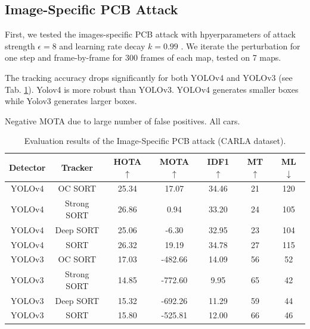 \vfill
\clearpage

\subsection{Image-Specific PCB Attack}

First, we tested the images-specific PCB attack with hpyerparameters of attack strength $\epsilon=8$ and learning rate decay $k=0.99$ . We iterate the perturbation for one step and frame-by-frame for 300 frames of each map, tested on 7 maps.


The tracking accuracy drops significantly for both YOLOv4 and YOLOv3 (see Tab. \ref{tab.carla_pcb}). Yolov4 is more robust than YOLOv3. YOLOv4 generates smaller boxes while Yolov3 generates larger boxes.

Negative MOTA due to large number of false positives. All cars.


\begin{table}[H]
\centering
\begin{tabular}{ ccccccc } 
\hline
Detector & Tracker & HOTA $\uparrow$ & MOTA $\uparrow$ & IDF1 $\uparrow$ & MT $\uparrow$ & ML $\downarrow$ \\
\hline
YOLOv4 & OC SORT      &  25.34 &  17.07  &  34.46  &  21  &  120  \\
YOLOv4 & Strong SORT  &  26.86  &  0.94  &  33.20  &  24  & 105 \\ 
YOLOv4 & Deep SORT    &  25.06 &  -6.30  &  32.95  &  23 
 &  104  \\ 
YOLOv4 & SORT         &  26.32  &  19.19  &  34.78  &  27  &  115  \\ 
\hline
YOLOv3 & OC SORT      &  17.03 &  -482.66  &  14.09  &  56  &  52  \\
YOLOv3 & Strong SORT  &  14.85  &  -772.60  &  9.95  &  65 &  42 \\ 
YOLOv3 & Deep SORT    &  15.32  &  -692.26  &  11.29  &  59  &  44  \\ 
YOLOv3 & SORT         &  15.80  &  -525.81  &  12.00  &  66  &  46  \\ 
\hline
\end{tabular}
\caption{Evaluation results of the Image-Specific PCB attack (CARLA dataset).}
\label{tab.carla_pcb}
\end{table}

